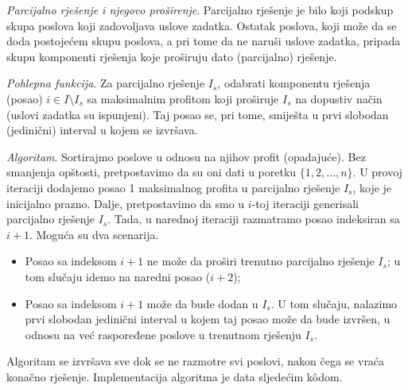 \textit{Parcijalno rješenje i njegovo proširenje}.  Parcijalno rješenje je bilo koji podskup skupa poslova koji zadovoljava uslove zadatka. Ostatak poslova, koji može da se doda postojećem skupu poslova, a pri tome da ne naruši uslove zadatka, pripada skupu komponenti rješenja koje proširuju dato (parcijalno) rješenje. 

\textit{Pohlepna funkcija}. Za parcijalno rješenje $I_s$, odabrati komponentu rješenja (posao) $i \in I\setminus I_s$ sa maksimalnim profitom koji proširuje $I_s$ na dopustiv način (uslovi zadatka su ispunjeni). Taj posao se, pri tome, smiješta u prvi slobodan (jedinični) interval u kojem se izvršava. 


\textit{Algoritam}. Sortirajmo poslove u odnosu na njihov profit (opadajuće). Bez smanjenja opštosti, pretpostavimo da su oni dati u poretku $\{1, 2, \ldots, n\}$. U provoj iteraciji dodajemo posao 1 maksimalnog profita u parcijalno rješenje $I_s$, koje je inicijalno prazno.  Dalje, pretpostavimo da smo u $i$-toj iteraciji generisali parcijalno rješenje $I_s$. Tada, u narednoj iteraciji razmatramo posao indeksiran sa $i+1$. Moguća su dva scenarija.

\begin{itemize}
	\item Posao sa indeksom $i+1$ ne može da proširi trenutno parcijalno rješenje $I_s$; u tom slučaju idemo na naredni posao ($i+2$);
	\item Posao sa indeksom $i+1$ može da bude dodan u $I_s$. U tom slučaju, nalazimo prvi slobodan jedinični interval u kojem taj posao može da bude izvršen, u odnosu na već raspoređene poslove u trenutnom rješenju $I_s$.  
\end{itemize} 

Algoritam se izvršava sve dok se ne razmotre svi poslovi, nakon čega se vraća konačno rješenje. Implementacija algoritma je data sljedećim k\^odom. 
 
